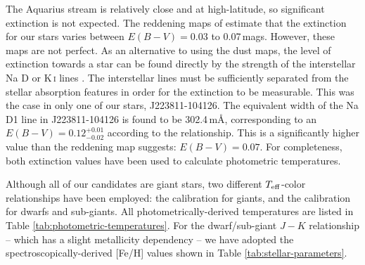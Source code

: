 \documentclass{emulateapj}
\begin{document}
The Aquarius stream is relatively close and at high-latitude, so significant extinction is not expected. The reddening maps of \citet{schlegel;et-al_1998} estimate that the extinction for our stars varies between ${E(B-V) = 0.03}$ to {0.07\,mags}. However, these maps are not perfect. As an alternative to using the \citet{schlegel;et-al_1998} dust maps, the level of extinction towards a star can be found directly by the strength of the interstellar Na D or K\,\textsc{i} lines \citep{munari;zwitter_1997}. The interstellar lines must be sufficiently separated from the stellar absorption features in order for the extinction to be measurable. This was the case in only one of our stars, J223811-104126. The equivalent width of the Na D1 line in J223811-104126 is found to be 302.4\,m{\AA}, corresponding to an ${E(B-V) = 0.12^{+0.01}_{-0.02}}$ according to the \citet{munari;zwitter_1997} relationship. This is a significantly higher value than the \citet{schlegel;et-al_1998} reddening map suggests: ${E(B-V) = 0.07}$. For completeness, both extinction values have been used to calculate photometric temperatures. 

Although all of our candidates are giant stars, two different $T_{\rm eff}$-color relationships have been employed: the \citet{alonso;et-al_1999} calibration for giants, and the \citet{casagrande;et-al_2010} calibration for dwarfs and sub-giants. All photometrically-derived temperatures are listed in Table \ref{tab:photometric-temperatures}. For the \citet{casagrande;et-al_2010} dwarf/sub-giant $J-K$ relationship -- which has a slight metallicity dependency -- we have adopted the spectroscopically-derived [Fe/H] values shown in Table \ref{tab:stellar-parameters}.
\end{document}
